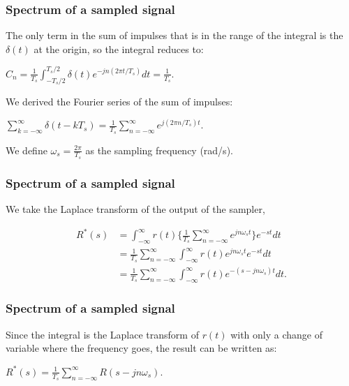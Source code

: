\begin{frame}
	\frametitle{Spectrum of a sampled signal}
	The only term in the sum of impulses that is in the range of the integral is the $\delta(t)$ at the origin, so the integral reduces to: \\
	\begin{center}
		$C_n=\frac{1}{T_s}\int_{-T_s/2}^{T_s/2}\delta(t)e^{-jn(2\pi t/T_s)}dt=\frac{1}{T_s}$.
	\end{center}
	We derived the Fourier series of the sum of impulses:\\
	\begin{center}
		$\sum_{k=-\infty}^{\infty} \delta(t-kT_s)=\frac{1}{T_s}\sum_{n=-\infty}^{\infty} e^{j(2\pi n/T_s)t}$.
	\end{center}
	We define $\omega_s = \frac{2\pi}{T_s}$ as the sampling frequency (rad/s).\\
\end{frame}

\begin{frame}
	\frametitle{Spectrum of a sampled signal}
	We take the Laplace transform of the output of the sampler,
	\vspace{-1em}
	\begin{center}
		\begin{equation}
			\begin{split}
			R^*(s)& = \int_{-\infty}^{\infty} r(t) \Big\{ \frac{1}{T_s} \sum_{n=-\infty}^{\infty} e^{jn\omega_st} \Big\} e^{-st} dt\\
			& = \frac{1}{T_s} \sum_{n=-\infty}^{\infty} \int_{-\infty}^{\infty} r(t) e^{jn\omega_st}e^{-st}dt\\
			& = \frac{1}{T_s} \sum_{n=-\infty}^{\infty} \int_{-\infty}^{\infty}r(t) e^{-(s-jn\omega_s)t} dt.
			\end{split}
		\end{equation}
	\end{center}
\end{frame}

\begin{frame}
	\frametitle{Spectrum of a sampled signal}
	\begin{definition}
	Since the integral is the Laplace transform of $r(t)$ with only a change of variable where the frequency goes, the result can be written as:\\
	\begin{center}
		$R^*(s)=\frac{1}{T_s}\sum_{n=-\infty}^{\infty}R(s-jn\omega_s)$.
	\end{center}
	\end{definition}
\end{frame}

